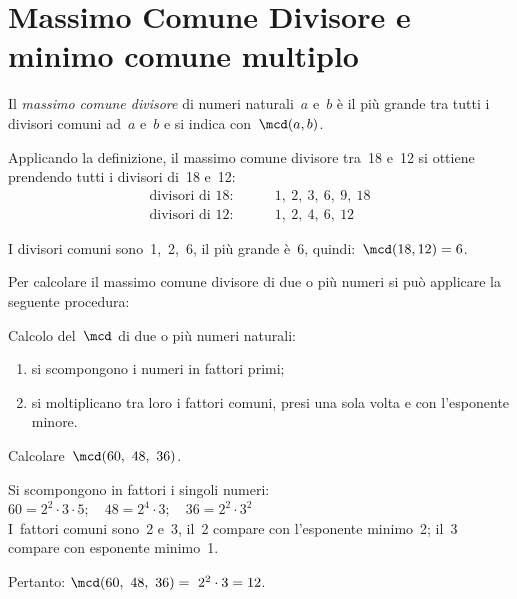 
\section{Massimo Comune Divisore e minimo comune multiplo}
\label{sec:nat_mcdemcm}

\label{def:mcd}
\begin{definizione}
Il \emph{massimo comune divisore} di numeri naturali~\(a\) e~\(b\)  è il
più grande tra tutti i divisori comuni ad~\(a\) e~\(b\)
e si indica con~\(\mcd(a,b)\).
\end{definizione}

Applicando la definizione, il massimo comune divisore tra~18 e~12 si 
ottiene prendendo tutti i divisori di~18 e~12:
\begin{align*}
\text{divisori di }18: & \qquad 1,~2,~3,~6,~9,~18\\
\text{divisori di }12: & \qquad 1,~2,~4,~6,~12
\end{align*}

I divisori comuni sono~1,~2,~6, il più grande è~6, quindi:~\(\mcd(18, 
12)=6\). 


Per calcolare il massimo comune divisore di due o più numeri si può 
applicare la seguente procedura:

\begin{procedura}
Calcolo del~\(\mcd\) di due o più numeri naturali:
\begin{enumerate}[noitemsep, label=(\alph*)]
 \item si scompongono i numeri in fattori primi;
 \item si moltiplicano tra loro i fattori comuni, 
  presi una sola volta e con l'esponente minore.
\end{enumerate}
\end{procedura}


\begin{esempio}
Calcolare~\(\mcd(60,~48,~36)\).

Si scompongono in fattori i singoli numeri:\\
\(60 = 2^2\cdot3\cdot5; \quad 48 = 2^4\cdot3; \quad 36 = 2^2\cdot3^2\)\\
I~fattori comuni sono~2 e~3, il~2 compare con l'esponente minimo~2; 
il~3 compare con esponente minimo~1.

Pertanto: \quad \(\mcd(60,~48,~36)=~2^2 \cdot 3 = 12\).
\end{esempio}

